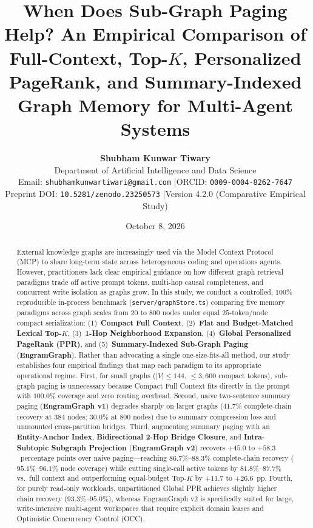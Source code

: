 \documentclass[10pt]{article}
\title{\LARGE \textbf{When Does Sub-Graph Paging Help? An Empirical Comparison of Full-Context, Top-$K$, Personalized PageRank, and Summary-Indexed Graph Memory for Multi-Agent Systems}}
\author{
  \textbf{Shubham Kunwar Tiwary}\\[3pt]
  \small Department of Artificial Intelligence and Data Science\\
  \small Email: \texttt{shubhamkunwartiwari@gmail.com} \quad|\quad ORCID: \texttt{0009-0004-8262-7647}\\
  \small Preprint DOI: \texttt{10.5281/zenodo.23250573} \quad|\quad Version 4.2.0 (Comparative Empirical Study)
}
\date{October 8, 2026}
\begin{document}
\maketitle

\begin{abstract}
\noindent
External knowledge graphs are increasingly used via the Model Context Protocol (MCP) to share long-term state across heterogeneous coding and operations agents. However, practitioners lack clear empirical guidance on how different graph retrieval paradigms trade off active prompt tokens, multi-hop causal completeness, and concurrent write isolation as graphs grow. In this study, we conduct a controlled, $100\%$ reproducible in-process benchmark (\texttt{server/graphStore.ts}) comparing five memory paradigms across graph scales from $20$ to $800$ nodes under equal $25$-token/node compact serialization: (1)~\textbf{Compact Full Context}, (2)~\textbf{Flat and Budget-Matched Lexical Top-$K$}, (3)~\textbf{1-Hop Neighborhood Expansion}, (4)~\textbf{Global Personalized PageRank (PPR)}, and (5)~\textbf{Summary-Indexed Sub-Graph Paging} (\textbf{EngramGraph}). Rather than advocating a single one-size-fits-all method, our study establishes four empirical findings that map each paradigm to its appropriate operational regime. First, for small graphs ($|V| \le 144$, $\le 3,600$ compact tokens), sub-graph paging is unnecessary because Compact Full Context fits directly in the prompt with $100.0\%$ coverage and zero routing overhead. Second, naive two-sentence summary paging (\textbf{EngramGraph v1}) degrades sharply on larger graphs ($41.7\%$ complete-chain recovery at $384$ nodes; $30.0\%$ at $800$ nodes) due to summary compression loss and unmounted cross-partition bridges. Third, augmenting summary paging with an \textbf{Entity-Anchor Index}, \textbf{Bidirectional 2-Hop Bridge Closure}, and \textbf{Intra-Subtopic Subgraph Projection} (\textbf{EngramGraph v2}) recovers $+45.0$ to $+58.3$~percentage points over naive paging—reaching $86.7\%$--$88.3\%$ complete-chain recovery ($95.1\%$--$96.1\%$ node coverage) while cutting single-call active tokens by $81.8\%$--$87.7\%$ vs.\ full context and outperforming equal-budget Top-$K$ by $+11.7$ to $+26.6$~pp. Fourth, for purely read-only workloads, unpartitioned Global PPR achieves slightly higher chain recovery ($93.3\%$--$95.0\%$), whereas EngramGraph v2 is specifically suited for large, write-intensive multi-agent workspaces that require explicit domain leases and Optimistic Concurrency Control (OCC).
\end{abstract}
\end{document}
